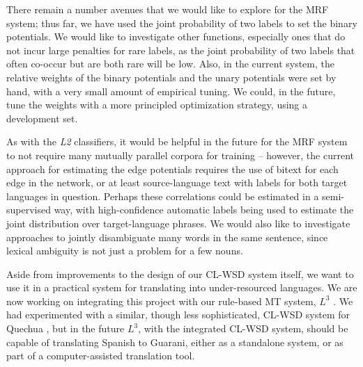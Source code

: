 \documentclass[11pt,letterpaper]{article}
\begin{document}
There remain a number avenues that we would like to explore for the MRF system;
thus far, we have used the joint probability of two labels to set the binary
potentials. We would like to investigate other functions, especially ones that
do not incur large penalties for rare labels, as the joint probability of two
labels that often co-occur but are both rare will be low.  Also, in the current
system, the relative weights of the binary potentials and the unary potentials
were set by hand, with a very small amount of empirical tuning. We could, in
the future, tune the weights with a more principled optimization strategy,
using a development set.


As with the \emph{L2} classifiers, it would be helpful in the future for the
MRF system to not require many mutually parallel corpora for training --
however, the current approach for estimating the edge potentials requires the
use of bitext for each edge in the network, or at least source-language text
with labels for both target languages in question. Perhaps these correlations
could be estimated in a semi-supervised way, with high-confidence automatic
labels being used to estimate the joint distribution over target-language
phrases.  We would also like to investigate approaches to jointly disambiguate
many words in the same sentence, since lexical ambiguity is not just a problem
for a few nouns.

Aside from improvements to the design of our CL-WSD system itself, we want to
use it in a practical system for translating into under-resourced languages.
We are now working on integrating this project with our rule-based MT system,
$L^3$ \cite{gasser:aflat2012}. We had experimented with a similar, though less
sophisticated, CL-WSD system for Quechua \cite{rudnick:2011:RANLPStud}, but in
the future $L^3$, with the integrated CL-WSD system, should be capable of
translating Spanish to Guarani, either as a standalone system, or as part of a
computer-assisted translation tool.



{}
\end{document}
